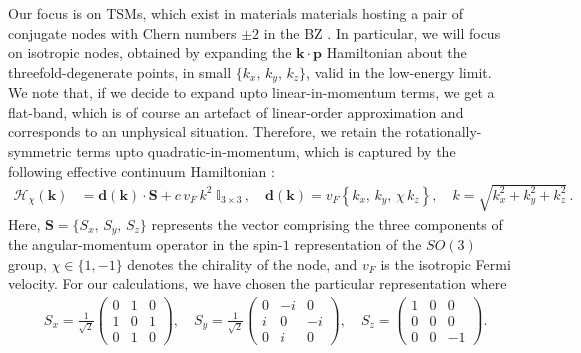 \documentclass[aps,prb,onecolumn,nofootinbib,citeautoscript,10pt]{revtex4-2}
\begin{document}
Our focus is on TSMs, which exist in materials materials hosting a pair of conjugate nodes with Chern numbers $ \pm 2 $ in the BZ \cite{bernevig, ady-spin1, grushin-multifold}. In particular, we will focus on isotropic nodes, obtained by expanding the $\boldsymbol{k} \cdot \boldsymbol {p}$ Hamiltonian about the threefold-degenerate points, in small $\lbrace k_x, \, k_y , \, k_z \rbrace $, valid in the low-energy limit. We note that, if we decide to expand upto linear-in-momentum terms, we get a flat-band, which is of course an artefact of linear-order approximation and corresponds to an unphysical situation. Therefore, we retain the rotationally-symmetric terms upto quadratic-in-momentum, which is captured by the following effective continuum Hamiltonian \cite{ni2021_giant}:
\begin{align} 
\label{eqham}
\mathcal{H}_\chi ( \boldsymbol k) & = 
\boldsymbol d ( \boldsymbol k) \cdot \boldsymbol  S 
+ c \,v_F \,  k^2  \; \mathbb{I}_{3\times 3} \,,
\quad 
\boldsymbol d( \boldsymbol k) =
v_F \left \lbrace k_x, \,k_y, \, \chi  \, k_z \right \rbrace, 
\quad k =\sqrt{k_x^2 +k_y^2 +k_z^2} \,.
\end{align}
Here, $\boldsymbol  S  = \lbrace S_x, \,S_y, \, S_z \rbrace$ represents the vector comprising the three components of the angular-momentum operator in the spin-$1$ representation of the $SO(3)$ group, $\chi \in \lbrace 1, -1 \rbrace $ denotes the chirality of the node, and $v_F$ is the isotropic Fermi velocity. For our calculations, we have chosen the particular representation where
\begin{align}
& S_x= \frac{1}{\sqrt{2}}
\begin{pmatrix}
	0 & 1  & 0  \\
	1 & 0 & 1  \\
	0 & 1 & 0  
\end{pmatrix} , \quad
S_y=\frac{1}{\sqrt{2}}
\begin{pmatrix}
	0 & -i  & 0  \\
	i & 0 & -i  \\
	0 & i & 0 
\end{pmatrix}, \quad
S_z =
\begin{pmatrix}
	1 & 0 & 0 \\
	0 & 0 & 0 \\
	0 & 0 &-1
\end{pmatrix}.
\end{align}
\end{document}
